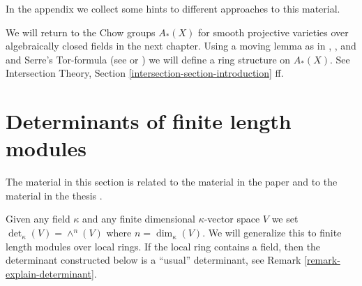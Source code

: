 \medskip\noindent
In the appendix we collect some hints to different approaches to this material.

\medskip\noindent
We will return to the Chow groups $A_*(X)$ for smooth projective varieties
over algebraically closed fields in the next chapter. Using a moving
lemma as in \cite{Samuel}, \cite{ChevalleyI}, and \cite{ChevalleyII}
and Serre's Tor-formula
(see \cite{Serre_local_algebra} or \cite{Serre_algebre_locale})
we will define a ring structure on $A_*(X)$. See
Intersection Theory, Section \ref{intersection-section-introduction} ff.



\section{Determinants of finite length modules}
\label{section-determinants-finite-length}

\noindent
The material in this section is related to the material in
the paper \cite{determinant} and to the material in the
thesis \cite{Joe}.

\medskip\noindent
Given any field $\kappa$ and any finite dimensional $\kappa$-vector space
$V$ we set $\det_\kappa(V) = \wedge^n(V)$ where $n = \dim_\kappa(V)$.
We will generalize this to finite length modules over local rings.
If the local ring contains a field, then the determinant constructed
below is a ``usual'' determinant, see
Remark \ref{remark-explain-determinant}.

